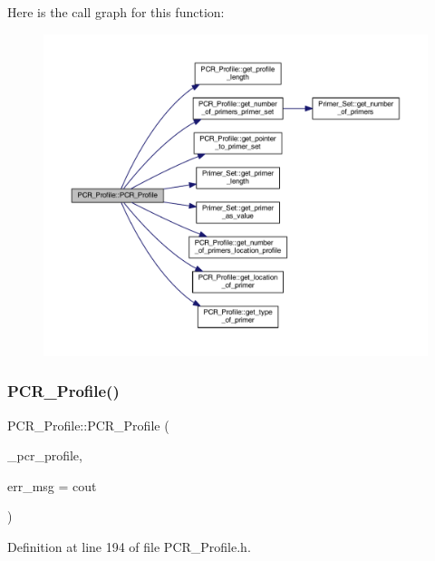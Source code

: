 Here is the call graph for this function\+:
\nopagebreak
\begin{figure}[H]
\begin{center}
\leavevmode
\includegraphics[width=350pt]{class_p_c_r___profile_a3b52a78e4b4db8f2c571aaf66bf9a2cc_cgraph}
\end{center}
\end{figure}
\mbox{\label{class_p_c_r___profile_a4b621dd306d51186d84ac65929f14e7b}} 
\subsubsection{\texorpdfstring{P\+C\+R\+\_\+\+Profile()}{PCR\_Profile()}\hspace{0.1cm}{\footnotesize\ttfamily [2/3]}}
{\footnotesize\ttfamily P\+C\+R\+\_\+\+Profile\+::\+P\+C\+R\+\_\+\+Profile (\begin{DoxyParamCaption}\item[{\mbox{\hyperlink{class_p_c_r___profile}{P\+C\+R\+\_\+\+Profile}} $\ast$}]{\+\_\+pcr\+\_\+profile,  }\item[{ostream \&}]{err\+\_\+msg = {\ttfamily cout} }\end{DoxyParamCaption})}



Definition at line 194 of file P\+C\+R\+\_\+\+Profile.\+h.


